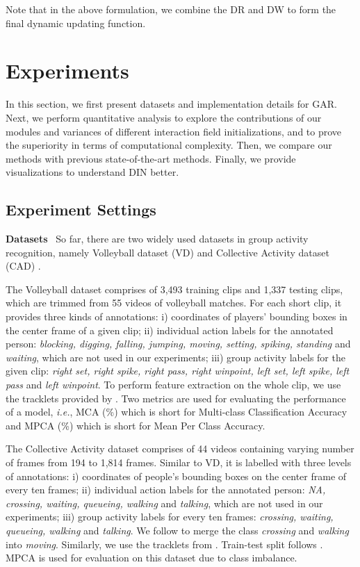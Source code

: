 \documentclass[10pt,twocolumn,letterpaper]{article}
\begin{document}
Note that in the above formulation, we combine the DR and DW to form the final dynamic updating function. 









\section{Experiments} \label{experiments}
In this section, we first present datasets and implementation details for GAR. Next, we perform quantitative analysis to explore the contributions of our modules and variances of different interaction field initializations, and to prove the superiority in terms of computational complexity. Then, we compare our methods with previous state-of-the-art methods. Finally, we provide visualizations to understand DIN better.

\subsection{Experiment Settings}
\textbf{Datasets} \ So far, there are two widely used datasets in group activity recognition, namely Volleyball dataset (VD) \cite{ibrahim2016hierarchical} and Collective Activity dataset (CAD) \cite{choi2009they}. 

The Volleyball dataset comprises of 3,493 training clips and 1,337 testing clips, which are trimmed from 55 videos of volleyball matches. For each short clip, it provides three kinds of annotations: i) coordinates of players' bounding boxes in the center frame of a given clip; ii) individual action labels for the annotated person: \textit{blocking, digging, falling, jumping, moving, setting, spiking, standing} and \textit{waiting}, which are not used in our experiments; iii) group activity labels for the given clip: \textit{right set, right spike, right pass, right winpoint, left set, left spike, left pass} and \textit{left winpoint}. To perform feature extraction on the whole clip, we use the tracklets provided by \cite{bagautdinov2017social}. Two metrics are used for evaluating the performance of a model, \textit{i.e.}, MCA (\%) which is short for Multi-class Classification Accuracy and MPCA (\%) which is short for Mean Per Class Accuracy.

The Collective Activity dataset comprises of 44 videos containing varying number of frames from 194 to 1,814 frames. Similar to VD, it is labelled with three levels of annotations: i) coordinates of people's bounding boxes on the center frame of every ten frames; ii) individual action labels for the annotated person: \textit{NA, crossing, waiting, queueing, walking} and \textit{talking}, which are not used in our experiments; iii) group activity labels for every ten frames: \textit{ crossing, waiting, queueing, walking} and \textit{talking}. We follow \cite{wang2017merge_two_class,yan2018pctdm,yan2020higcin} to merge the class \textit{crossing} and \textit{walking} into \textit{moving}. Similarly, we use the tracklets from \cite{bagautdinov2017social}. Train-test split follows \cite{qi2018stagnet}. MPCA is used for evaluation on this dataset due to class imbalance.
\end{document}
